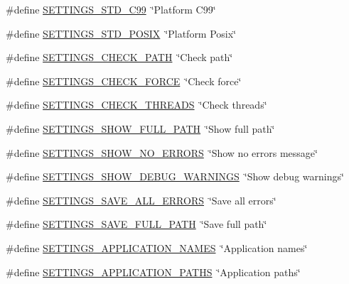 \begin{DoxyCompactItemize}
\#define \hyperlink{group___g_u_i_gaabf23554630791d0020ea7e4505b8691}{S\-E\-T\-T\-I\-N\-G\-S\-\_\-\-S\-T\-D\-\_\-\-C99}~\char`\"{}Platform C99\char`\"{}
\item 
\#define \hyperlink{group___g_u_i_ga61e6e622338fff1048e17a77e069f16f}{S\-E\-T\-T\-I\-N\-G\-S\-\_\-\-S\-T\-D\-\_\-\-P\-O\-S\-I\-X}~\char`\"{}Platform Posix\char`\"{}
\item 
\#define \hyperlink{group___g_u_i_ga88324727e45188bf7507660d65dec829}{S\-E\-T\-T\-I\-N\-G\-S\-\_\-\-C\-H\-E\-C\-K\-\_\-\-P\-A\-T\-H}~\char`\"{}Check path\char`\"{}
\item 
\#define \hyperlink{group___g_u_i_ga6af4b6db9668e0946faec32b2971c3fe}{S\-E\-T\-T\-I\-N\-G\-S\-\_\-\-C\-H\-E\-C\-K\-\_\-\-F\-O\-R\-C\-E}~\char`\"{}Check force\char`\"{}
\item 
\#define \hyperlink{group___g_u_i_gaedfaffc4ce62457dd5e5875f06e90708}{S\-E\-T\-T\-I\-N\-G\-S\-\_\-\-C\-H\-E\-C\-K\-\_\-\-T\-H\-R\-E\-A\-D\-S}~\char`\"{}Check threads\char`\"{}
\item 
\#define \hyperlink{group___g_u_i_ga499b238ff88808bb5fdd36ae2485fa1e}{S\-E\-T\-T\-I\-N\-G\-S\-\_\-\-S\-H\-O\-W\-\_\-\-F\-U\-L\-L\-\_\-\-P\-A\-T\-H}~\char`\"{}Show full path\char`\"{}
\item 
\#define \hyperlink{group___g_u_i_ga427e47ee9d20ce1c3e754707f0f03a67}{S\-E\-T\-T\-I\-N\-G\-S\-\_\-\-S\-H\-O\-W\-\_\-\-N\-O\-\_\-\-E\-R\-R\-O\-R\-S}~\char`\"{}Show no errors message\char`\"{}
\item 
\#define \hyperlink{group___g_u_i_ga93c329d837e52361679067da4d7638f3}{S\-E\-T\-T\-I\-N\-G\-S\-\_\-\-S\-H\-O\-W\-\_\-\-D\-E\-B\-U\-G\-\_\-\-W\-A\-R\-N\-I\-N\-G\-S}~\char`\"{}Show debug warnings\char`\"{}
\item 
\#define \hyperlink{group___g_u_i_gaec73271f460e1023b62899e1fff1cf25}{S\-E\-T\-T\-I\-N\-G\-S\-\_\-\-S\-A\-V\-E\-\_\-\-A\-L\-L\-\_\-\-E\-R\-R\-O\-R\-S}~\char`\"{}Save all errors\char`\"{}
\item 
\#define \hyperlink{group___g_u_i_ga7a3ab6305fb3646c2454d917fefd96bb}{S\-E\-T\-T\-I\-N\-G\-S\-\_\-\-S\-A\-V\-E\-\_\-\-F\-U\-L\-L\-\_\-\-P\-A\-T\-H}~\char`\"{}Save full path\char`\"{}
\item 
\#define \hyperlink{group___g_u_i_gaf6780a9e573ef2521506c1574f647e5e}{S\-E\-T\-T\-I\-N\-G\-S\-\_\-\-A\-P\-P\-L\-I\-C\-A\-T\-I\-O\-N\-\_\-\-N\-A\-M\-E\-S}~\char`\"{}Application names\char`\"{}
\item 
\#define \hyperlink{group___g_u_i_gaeeee5e02edc5988dd9055d13973ae40c}{S\-E\-T\-T\-I\-N\-G\-S\-\_\-\-A\-P\-P\-L\-I\-C\-A\-T\-I\-O\-N\-\_\-\-P\-A\-T\-H\-S}~\char`\"{}Application paths\char`\"{}

\end{DoxyCompactItemize}
